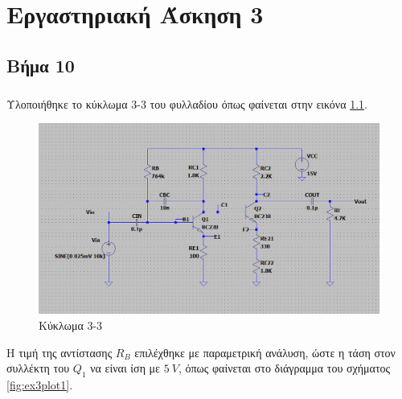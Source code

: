 \documentclass[11pt,a4paper,twoside,onecolumn,openright,final]{memoir}
\begin{document}

\chapter{Εργαστηριακή Άσκηση 3}

\section{Βήμα 10}

\paragraph*{} Υλοποιήθηκε το κύκλωμα 3-3 του φυλλαδίου όπως φαίνεται στην εικόνα \ref{fig:ex3circuit1}.

\begin{figure}[H]
\centerfloat%
\includegraphics[width=15.0cm]{figures/exercise3circuit1.png}
\caption{Κύκλωμα 3-3}\label{fig:ex3circuit1}
\end{figure}

 Η τιμή της αντίστασης \(R_B\) επιλέχθηκε με παραμετρική ανάλυση, ώστε η τάση στον συλλέκτη του \(Q_1\) να είναι ίση με \(5 \ V\), όπως φαίνεται στο διάγραμμα του σχήματος \ref{fig:ex3plot1}.
\end{document}
